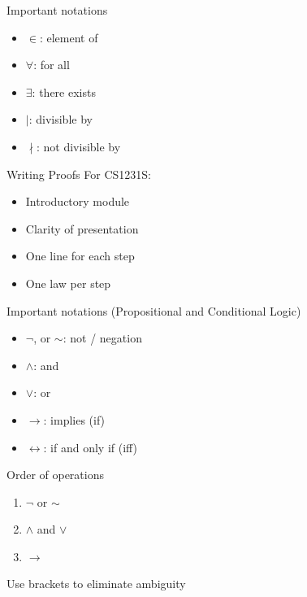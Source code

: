 \documentclass[10pt]{beamer}
\begin{document}
\begin{frame}[fragile]{Important notations}
\begin{itemize}
\item $\in$: element of
\item $\forall$: for all
\item $\exists$: there exists
\item $\mid$: divisible by
\item $\nmid$: not divisible by
\end{itemize}
\end{frame}

\begin{frame}[fragile]{Writing Proofs}
For CS1231S:
\begin{itemize}
\item Introductory module
\item Clarity of presentation
\item One line for each step
\item One law per step
\end{itemize}
\end{frame}

\begin{frame}[fragile]{Important notations (Propositional and Conditional Logic)}
\begin{itemize}
\item $\lnot$, or $\sim$: not / negation
\item $\land$: and
\item $\lor$: or
\item $\rightarrow$: implies (if)
\item $\leftrightarrow$: if and only if (iff)
\end{itemize}
\end{frame}

\begin{frame}[fragile]{Order of operations}
\begin{enumerate}
\item $\lnot$ or $\sim$
\item $\land$ and $\lor$
\item $\rightarrow$
\end{enumerate}
Use brackets to eliminate ambiguity
\end{frame}
\end{document}

